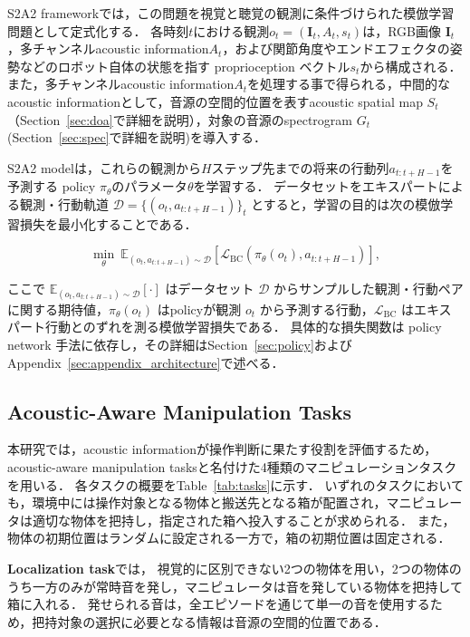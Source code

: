 \documentclass{article}
\begin{document}
	S2A2 frameworkでは，この問題を視覚と聴覚の観測に条件づけられた模倣学習問題として定式化する．
	各時刻$t$における観測$o_t=(\mathbf{I}_t,A_t,s_t)$は，RGB画像 $\mathbf{I}_t$，多チャンネルacoustic information$A_t$，および関節角度やエンドエフェクタの姿勢などのロボット自体の状態を指す proprioception ベクトル$s_t$から構成される．
	また，多チャンネルacoustic information$A_t$を処理する事で得られる，中間的なacoustic informationとして，音源の空間的位置を表すacoustic spatial map $S_t$（Section~\ref{sec:doa}で詳細を説明），対象の音源のspectrogram $G_t$ (Section~\ref{sec:spec}で詳細を説明)を導入する．

	S2A2 modelは，これらの観測から$H$ステップ先までの将来の行動列$a_{t:t+H-1}$を予測する policy $\pi_\theta$のパラメータ$\theta$を学習する．
	データセットをエキスパートによる観測・行動軌道 $\mathcal{D}=\{(o_t,a_{t:t+H-1})\}_t$ とすると，学習の目的は次の模倣学習損失を最小化することである．

	\begin{equation}
	\min_{\theta}\ \mathbb{E}_{(o_t,a_{t:t+H-1})\sim\mathcal{D}}
	\left[\mathcal{L}_{\mathrm{BC}}\left(\pi_\theta(o_t),a_{t:t+H-1}\right)\right],
	\end{equation}

	ここで $\mathbb{E}_{(o_t,a_{t:t+H-1})\sim\mathcal{D}}[\cdot]$ はデータセット $\mathcal{D}$ からサンプルした観測・行動ペアに関する期待値，$\pi_\theta(o_t)$ はpolicyが観測 $o_t$ から予測する行動，$\mathcal{L}_{\mathrm{BC}}$ はエキスパート行動とのずれを測る模倣学習損失である．
	具体的な損失関数は policy network 手法に依存し，その詳細はSection~\ref{sec:policy}およびAppendix~\ref{sec:appendix_architecture}で述べる．

\subsection{Acoustic-Aware Manipulation Tasks}
\label{sec:tasks}
本研究では，acoustic informationが操作判断に果たす役割を評価するため，acoustic-aware manipulation tasksと名付けた4種類のマニピュレーションタスクを用いる．
各タスクの概要をTable~\ref{tab:tasks}に示す．
いずれのタスクにおいても，環境中には操作対象となる物体と搬送先となる箱が配置され，マニピュレータは適切な物体を把持し，指定された箱へ投入することが求められる．
また，物体の初期位置はランダムに設定される一方で，箱の初期位置は固定される．

\textbf{Localization task}では，
視覚的に区別できない2つの物体を用い，2つの物体のうち一方のみが常時音を発し，マニピュレータは音を発している物体を把持して箱に入れる．
発せられる音は，全エピソードを通じて単一の音を使用するため，把持対象の選択に必要となる情報は音源の空間的位置である．
\end{document}
